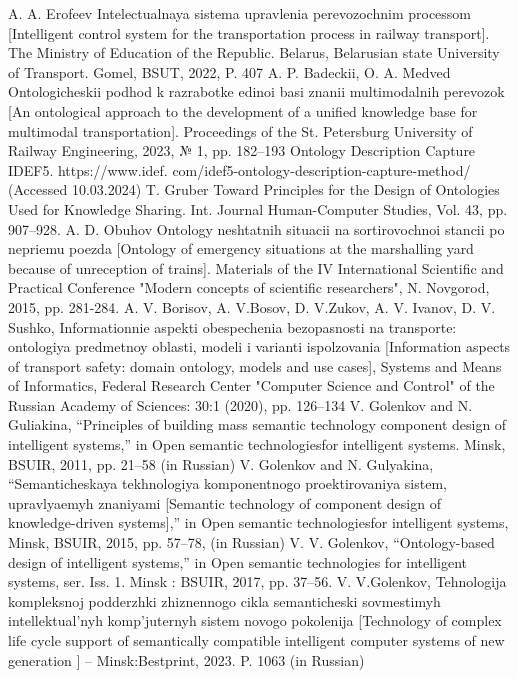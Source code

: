 \documentclass[a4paper]{article}
\begin{document}
\begin{multicols}{2}
\centering\renewcommand{\refname}{References}
\begin{thebibliography}{10}
\itemsep=-1.5mm
\bibitem A. A. Erofeev Intelectualnaya sistema upravlenia perevozochnim
processom [Intelligent control system for the transportation process in railway transport]. The Ministry of Education of the Republic. Belarus, Belarusian state University of Transport. Gomel,
BSUT, 2022, P. 407
\bibitem A. P. Badeckii, O. A. Medved Ontologicheskii podhod k
razrabotke edinoi basi znanii multimodalnih perevozok [An ontological approach to the development of a unified knowledge base for multimodal transportation]. Proceedings of the St. Petersburg University of Railway Engineering, 2023, № 1, pp. 182–193
\bibitem 
Ontology Description Capture IDEF5. https://www.idef.
com/idef5-ontology-description-capture-method/ (Accessed
10.03.2024)
\bibitem T. Gruber Toward Principles for the Design of Ontologies Used
for Knowledge Sharing. Int. Journal Human-Computer Studies,
Vol. 43, pp. 907–928.
\bibitem A. D. Obuhov Ontology neshtatnih situacii na sortirovochnoi
stancii po nepriemu poezda [Ontology of emergency situations
at the marshalling yard because of unreception of trains]. Materials of the IV International Scientific and Practical Conference
"Modern concepts of scientific researchers", N. Novgorod, 2015,
pp. 281-284.
\bibitem A. V. Borisov, A. V.Bosov, D. V.Zukov, A. V. Ivanov, D. V.
Sushko, Informationnie aspekti obespechenia bezopasnosti na
transporte: ontologiya predmetnoy oblasti, modeli i varianti ispolzovania [Information aspects of transport safety: domain ontology, models and use cases], Systems and Means of Informatics,
Federal Research Center "Computer Science and Control" of the
Russian Academy of Sciences: 30:1 (2020), pp. 126–134
\bibitem V. Golenkov and N. Guliakina, “Principles of building mass
semantic technology component design of intelligent systems,”
in Open semantic technologiesfor intelligent systems. Minsk,
BSUIR, 2011, pp. 21–58 (in Russian)
\bibitem V. Golenkov and N. Gulyakina, “Semanticheskaya tekhnologiya
komponentnogo proektirovaniya sistem, upravlyaemyh znaniyami
[Semantic technology of component design of knowledge-driven
systems],” in Open semantic technologiesfor intelligent systems,
Minsk, BSUIR, 2015, pp. 57–78, (in Russian)
\bibitem  V. V. Golenkov, “Ontology-based design of intelligent systems,”
in Open semantic technologies for intelligent systems, ser. Iss. 1.
Minsk : BSUIR, 2017, pp. 37–56.
\bibitem V. V.Golenkov, Tehnologija kompleksnoj podderzhki zhiznennogo
cikla semanticheski sovmestimyh intellektual’nyh komp’juternyh
sistem novogo pokolenija [Technology of complex life cycle
support of semantically compatible intelligent computer systems
of new generation ] – Minsk:Bestprint, 2023. P. 1063 (in Russian)
\end{thebibliography}


\end{multicols}
\end{document}
